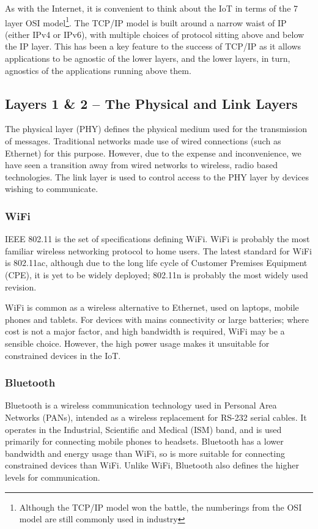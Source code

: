 \documentclass[10pt,journal,compsoc]{IEEEtran}
\begin{document}
As with the Internet, it is convenient to think about the IoT in terms of the 7
layer OSI model\footnote{Although the TCP/IP model won the battle, the
numberings from the OSI model are still commonly used in industry}.  The TCP/IP
model is built around a narrow waist of IP (either IPv4 or IPv6), with multiple
choices of protocol sitting above and below the IP layer. This has been a key
feature to the success of TCP/IP as it allows applications to be agnostic of
the lower layers, and the lower layers, in turn, agnostics of the applications
running above them. 

\subsection{Layers 1 \& 2 -- The Physical and Link Layers}
\label{layer_1_2}
The physical layer (PHY) defines the physical medium used for the transmission
of messages. Traditional networks made use of wired connections (such as
Ethernet) for this purpose. However, due to the expense and inconvenience, we
have seen a transition away from wired networks to wireless, radio based
technologies. The link layer is used to control access to the PHY layer by
devices wishing to communicate.

\subsubsection{WiFi}
IEEE 802.11 is the set of specifications defining WiFi. WiFi is probably the
most familiar wireless networking protocol to home users. The latest standard
for WiFi is 802.11ac, although due to the long life cycle of Customer Premises
Equipment (CPE), it is yet to be widely deployed; 802.11n is probably the
most widely used revision. 

WiFi is common as a wireless alternative to Ethernet, used on laptops, mobile
phones and tablets. For devices with mains connectivity or large batteries;
where cost is not a major factor, and high bandwidth is required, WiFi may be a
sensible choice. However, the high power usage makes it unsuitable for
constrained devices in the IoT.

\subsubsection{Bluetooth}
Bluetooth is a wireless communication technology used in Personal Area Networks
(PANs), intended as a wireless replacement for RS-232 serial cables. It
operates in the Industrial, Scientific and Medical (ISM) band, and is used
primarily for connecting mobile phones to headsets. Bluetooth has a lower
bandwidth and energy usage than WiFi, so is more suitable for connecting
constrained devices than WiFi. Unlike WiFi, Bluetooth also defines the higher
levels for communication. 
\end{document}
